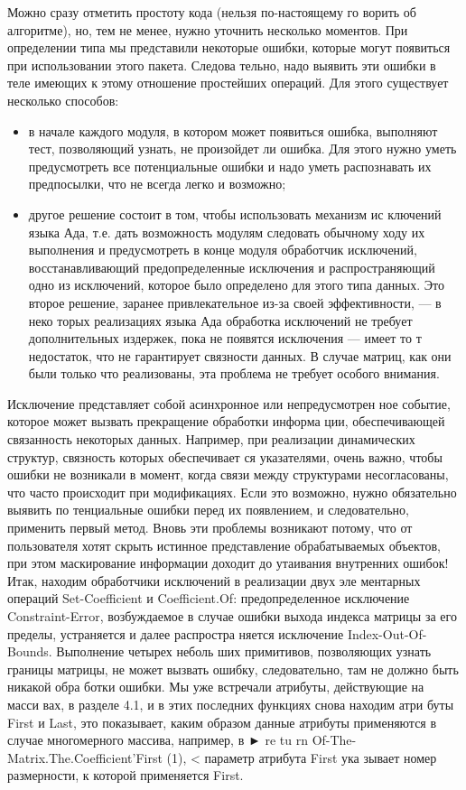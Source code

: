 Можно сразу отметить простоту кода (нельзя по-настоящему го­
	ворить об алгоритме), но, тем не менее, нужно уточнить несколько
моментов. При определении типа мы представили некоторые ошибки,
которые могут появиться при использовании этого пакета. Следова­
тельно, надо выявить эти ошибки в теле имеющих к этому отношение
простейших операций. Для этого существует несколько способов:


\begin{itemize}  
\item в начале каждого модуля, в котором может появиться ошибка,
выполняют тест, позволяющий узнать, не произойдет ли ошибка.
Для этого нужно уметь предусмотреть все потенциальные ошибки
и надо уметь распознавать их предпосылки, что не всегда легко
и возможно;
\item другое решение состоит в том, чтобы использовать механизм ис­
ключений языка Ада, т.е. дать возможность модулям следовать
\newpage
обычному ходу их выполнения и предусмотреть в конце модуля
обработчик исключений, восстанавливающий предопределенные
исключения и распространяющий одно из исключений, которое
было определено для этого типа данных. Это второе решение,
заранее привлекательное из-за своей эффективности, — в неко­
торых реализациях языка Ада обработка исключений не требует
дополнительных издержек, пока не появятся исключения — имеет
то т недостаток, что не гарантирует связности данных. В случае
матриц, как они были только что реализованы, эта проблема не
требует особого внимания.
\end{itemize}

Исключение представляет собой асинхронное или непредусмотрен­
ное событие, которое может вызвать прекращение обработки информа­
ции, обеспечивающей связанность некоторых данных. Например, при
реализации динамических структур, связность которых обеспечивает­
ся указателями, очень важно, чтобы ошибки не возникали в момент,
когда связи между структурами несогласованы, что часто происходит
при модификациях. Если это возможно, нужно обязательно выявить по­
тенциальные ошибки перед их появлением, и следовательно, применить
первый метод.
Вновь эти проблемы возникают потому, что от пользователя хотят
скрыть истинное представление обрабатываемых объектов, при этом
маскирование информации доходит до утаивания внутренних ошибок!
Итак, находим обработчики исключений в реализации двух эле­
ментарных операций Set-Coefficient и Coefficient.Of: предопределенное
исключение Constraint-Error, возбуждаемое в случае ошибки выхода
индекса матрицы за его пределы, устраняется и далее распростра­
няется исключение Index-Out-Of-Bounds. Выполнение четырех неболь­
ших примитивов, позволяющих узнать границы матрицы, не может
вызвать ошибку, следовательно, там не должно быть никакой обра­
ботки ошибки. Мы уже встречали атрибуты, действующие на масси­
вах, в разделе 4.1, и в этих последних функциях снова находим атри­
буты First и Last, это показывает, каким образом данные атрибуты
применяются в случае многомерного массива, например, в ► re tu rn
Of-The-Matrix.The.Coefficient’First (1), < параметр атрибута First ука­
зывает номер размерности, к которой применяется First.

